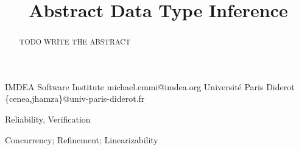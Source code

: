 \documentclass[10pt,preprint,nocopyrightspace]{sigplanconf}
\begin{document}
\setlength{\pdfpageheight}{\paperheight}
\setlength{\pdfpagewidth}{\paperwidth}






\title{Abstract Data Type Inference}

           {IMDEA Software Institute}
           {michael.emmi@imdea.org}
           {Université Paris Diderot}
           {\{cenea,jhamza\}@univ-paris-diderot.fr}

\maketitle

\begin{abstract}

  TODO WRITE THE ABSTRACT

\end{abstract}


\terms
Reliability, Verification

\keywords
Concurrency; Refinement; Linearizability













%
%
%
\end{document}
